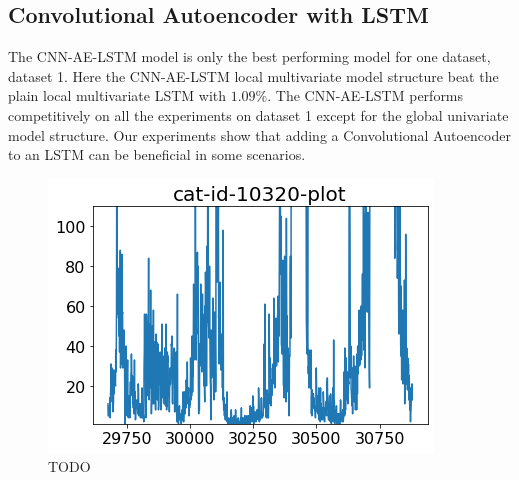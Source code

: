 
\subsection{Convolutional Autoencoder with LSTM}
The CNN-AE-LSTM model is only the best performing model for one dataset, dataset 1.
Here the CNN-AE-LSTM local multivariate model structure beat the plain local multivariate LSTM with $1.09\%$.
The CNN-AE-LSTM performs competitively on all the experiments on dataset 1 except for the global univariate model structure.
Our experiments show that adding a Convolutional Autoencoder to an LSTM can be beneficial in some scenarios.


\begin{figure}[h!]
  \centering
  \includegraphics[width=\textwidth]{./figs/code_generated/data_exploration/cat-id-10320-plot.png}
  \hfill
  \caption{TODO}
  \label{fig:cat-id-10320-cnn-ae-beat-lstm}
\end{figure}
